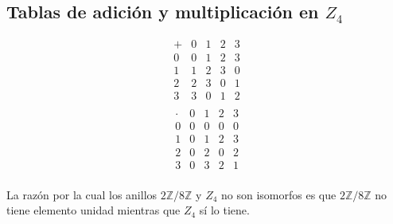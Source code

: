 \begin{enumerate}
\section*{Tablas de adición y multiplicación en \(Z_4\)}
\begin{multicols}{2}
\[
\begin{array}{c|cccc}
+ & 0 & 1 & 2 & 3 \\
\hline
0 & 0 & 1 & 2 & 3 \\
1 & 1 & 2 & 3 & 0 \\
2 & 2 & 3 & 0 & 1 \\
3 & 3 & 0 & 1 & 2 \\
\end{array}
\]
\[
\begin{array}{c|cccc}
\cdot & 0 & 1 & 2 & 3 \\
\hline
0 & 0 & 0 & 0 & 0 \\
1 & 0 & 1 & 2 & 3 \\
2 & 0 & 2 & 0 & 2 \\
3 & 0 & 3 & 2 & 1 \\
\end{array}
\]
\end{multicols}

La razón por la cual los anillos \(2\mathbb{Z}/8\mathbb{Z}\) y \(Z_4\) no son isomorfos es que \(2\mathbb{Z}/8\mathbb{Z}\) no tiene elemento unidad mientras que \(Z_4\) sí lo tiene.
\end{enumerate}
